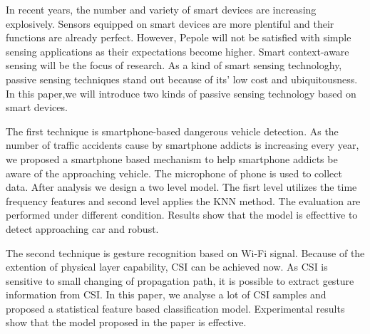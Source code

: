 \begin{eabstract}
In recent years, the number and variety of smart devices are increasing explosively. Sensors equipped on smart devices are more plentiful and their functions are already perfect. However, Pepole will not be satisfied with simple sensing applications as their expectations become higher. Smart context-aware sensing will be the focus of research. As a kind of smart sensing technologhy, passive sensing techniques stand out because of its' low cost and ubiquitousness. In this paper,we will introduce two kinds of passive sensing technology based on smart devices.

The first technique is smartphone-based dangerous vehicle detection. As the number of traffic accidents cause by smartphone addicts is increasing every year, we proposed a smartphone based mechanism to help smartphone addicts 
be aware of the approaching vehicle. The microphone of phone is used to collect data. After analysis we design a two level model. The fisrt level utilizes the time frequency features and second level applies the KNN method. The evaluation are performed under different condition. Results show that the model is effecttive to detect approaching car and robust.

The second technique is gesture recognition based on Wi-Fi signal. Because of the extention of physical layer capability, CSI can be achieved now. As CSI is sensitive to small changing of propagation path, it is possible to extract gesture information from CSI. In this paper, we analyse a lot of CSI samples and proposed a statistical feature based classification model. Experimental results show that the model proposed in the paper is effective.

\end{eabstract}

